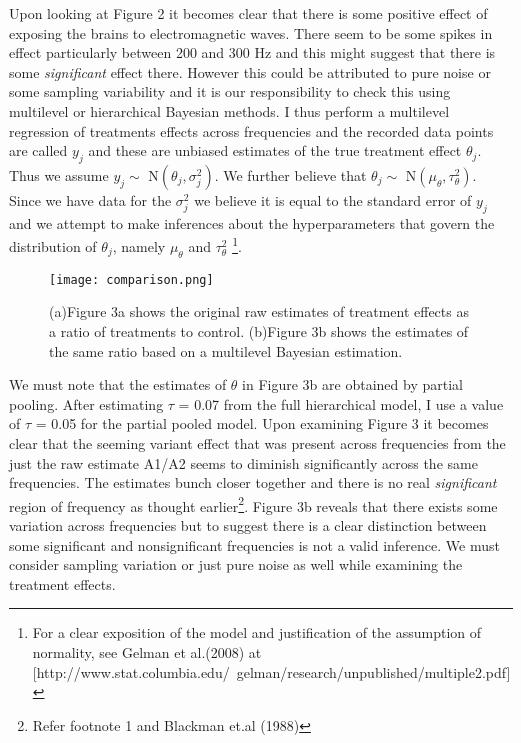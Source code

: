 \documentclass{article}
\begin{document}
Upon looking at Figure 2 it becomes clear that there is some positive effect of exposing the brains to electromagnetic waves. There seem to be some spikes in effect particularly between 200 and 300 Hz and this might suggest that there is some \emph{significant} effect there. However this could be attributed to pure noise or some sampling variability and it is our responsibility to check this using multilevel or hierarchical Bayesian methods. I thus perform a multilevel regression of treatments effects across frequencies and the recorded data points are called $y_j$ and these are unbiased estimates of the true treatment effect $\theta_j$. Thus we assume $y_j \sim$ N$(\theta_j, \sigma_{j}^2)$. We further believe that $\theta_j \sim$ N$(\mu_{\theta}, \tau_{\theta}^2)$. Since we have data for the $\sigma_{j}^2$ we believe it is equal to the standard error of $y_j$ and we attempt to make inferences about the hyperparameters that govern the distribution of $\theta_j$, namely $\mu_{\theta}$ and $\tau_{\theta}^2$ \footnote{For a clear exposition of the model and justification of the assumption of normality, see Gelman et al.(2008) at [http://www.stat.columbia.edu/~gelman/research/unpublished/multiple2.pdf]}.
 \begin{figure}[H]
\centering
\texttt{[image: comparison.png]}
\caption{(a)Figure 3a shows the original raw estimates of treatment effects as a ratio of treatments to control. (b)Figure 3b shows the estimates of the same ratio based on a multilevel Bayesian estimation.}
\label{deltat}
\end{figure}

We must note that the estimates of $\theta$ in Figure 3b are obtained by partial pooling. After estimating $\tau$ = 0.07 from the full hierarchical model, I use a value of $\tau$ = 0.05 for the partial pooled model. Upon examining Figure 3 it becomes clear that the seeming variant effect that was present across frequencies from the just the raw estimate A1/A2 seems to diminish significantly across the same frequencies. The estimates bunch closer together and there is no real \emph{significant} region of frequency as thought earlier\footnote{Refer footnote 1 and Blackman et.al (1988)}. Figure 3b reveals that there exists some variation across frequencies but to suggest there is a clear distinction between some significant and nonsignificant frequencies is not a valid inference. We must consider sampling variation or just pure noise as well while examining the treatment effects.
\end{document}
